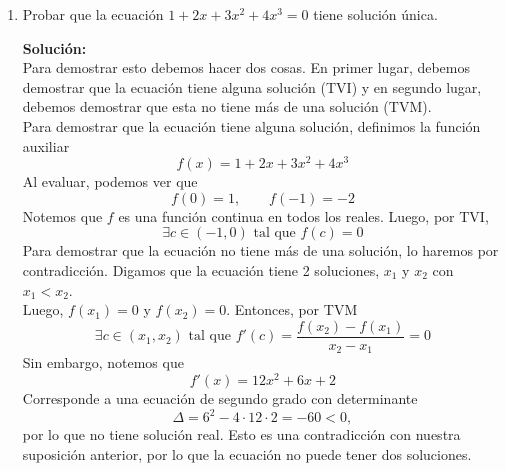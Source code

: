 \documentclass[12pt]{article}
\newenvironment{solucion}
{\begin{mdframed}[backgroundcolor=black!10]
		{\bf Solución:}\\
	}
	{
	\end{mdframed}
}
\newenvironment{preguntas}
{\begin{enumerate}\itemsep12pt
	}
	{
	\end{enumerate}
}
\newcommand{\ra}{\rightarrow}
\begin{document}
\begin{preguntas}
\begin{solucion}
Luego, tendremos los siguientes escenarios.\\

Para $k \in (-2,2)$, no habrá ningún punto crítico, ya que la ecuación anterior no tiene solución.\\

Para $k = 2 y k = -2$, habrá un punto crítico en $x=k$. Además, este punto crítico será un punto de inflexión.\\

Para $k\in (-\infty, -2) \cup (2, \infty)$, habrán dos puntos críticos en 
$$x = k + \sqrt[]{k^2-4} \qquad y \qquad x = k - \sqrt[]{k^2-4}$$
Notemos además que para $x < k \ra f''(x) < 0$ y para $x > k \ra f''(x) > 0$, por lo que el punto crítico $x = k + \sqrt[]{k^2-4} > k$ corresponderá a un mínimo y $x = k - \sqrt[]{k^2-4} < k$ corresponderá a un máximo.
\end{solucion}
\item Probar que la ecuación $1+2x+3x^2+4x^3=0$ tiene solución única.
\begin{solucion}
Para demostrar esto debemos hacer dos cosas. En primer lugar, debemos demostrar que la ecuación tiene alguna solución (TVI) y en segundo lugar, debemos demostrar que esta no tiene más de una solución (TVM).\\

Para demostrar que la ecuación tiene alguna solución, definimos la función auxiliar
$$f(x) = 1+2x+3x^2+4x^3$$
Al evaluar, podemos ver que
$$f(0) = 1, \qquad f(-1) = -2$$
Notemos que $f$ es una función continua en todos los reales. Luego, por TVI, 
$$\exists c \in (-1,0) \text{ tal que } f(c) = 0$$
Para demostrar que la ecuación no tiene más de una solución, lo haremos por contradicción. Digamos que la ecuación tiene 2 soluciones, $x_1$ y $x_2$ con $x_1 < x_2$.\\

Luego, $f(x_1) = 0$ y $f(x_2) = 0$. Entonces, por TVM
$$\exists c \in (x_1, x_2) \text{ tal que } f'(c) = \dfrac{f(x_2) - f(x_1)}{x_2-x_1} = 0$$
Sin embargo, notemos que
$$f'(x) = 12x^2 + 6x + 2$$
Corresponde a una ecuación de segundo grado con determinante 
$$\Delta = 6^2-4\cdot 12 \cdot 2 = -60 < 0,$$
por lo que no tiene solución real. Esto es una contradicción con nuestra suposición anterior, por lo que la ecuación no puede tener dos soluciones.\\


\end{solucion}
\end{preguntas}
\end{document}
